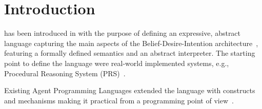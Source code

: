 \section{Introduction}
\label{sec:intro}


%
%
{\asl} has been introduced in \cite{Rao96}  with the purpose of defining an expressive, 
abstract language capturing the main aspects of the Belief-Desire-Intention architecture~\cite{Bratman88,Georgeff:1987:RRP:1863766.1863818}, featuring a formally defined semantics and an abstract interpreter.
%
The starting point to define the language were real-world implemented systems, e.g.,
Procedural Reasoning System (PRS)~\cite{Ingrand:1992:ARR:629535.629890}.
%

%
% 


%
%
Existing Agent Programming Languages extended the language with
constructs and mechanisms making it practical from a programming point
of view~\cite{jason06,DBLP:conf/prima/CollierRL15}.
%

